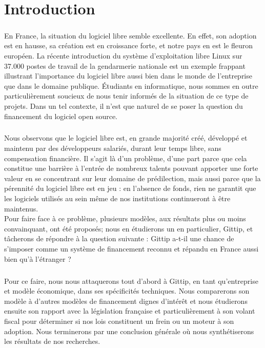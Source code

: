 \chapter*{Introduction}

\paragraph{}
En France, la situation du logiciel libre semble excellente.
En effet, son adoption est en hausse, sa création est en croissance forte,
et notre pays en est le fleuron européen.
La récente introduction du système d'exploitation libre Linux sur 37.000
postes de travail de la gendarmerie nationale est un exemple frappant
illustrant l'importance du logiciel libre aussi bien dans le monde de
l'entreprise que dans le domaine publique.
Étudiants en informatique, nous sommes en outre particulièrement soucieux
de nous tenir informés de la situation de ce type de projets.
Dans un tel contexte, il n'est que naturel de se poser la question du
financement du logiciel open source.

\paragraph{}
Nous observons que le logiciel libre est, en grande majorité créé,
développé et maintenu par des développeurs salariés, durant leur temps
libre, sans compensation financière. Il s'agit là d'un problème, d'une
part parce que cela constitue une barrière à l'entrée de nombreux talents
pouvant apporter une forte valeur en se concentrant sur leur domaine de
prédilection, mais aussi parce que la pérennité du logiciel libre est en
jeu : en l'absence de fonds, rien ne garantit que les logiciels utilisés
au sein même de nos institutions continueront à être maintenus.\\
Pour faire face à ce problème, plusieurs modèles, aux résultats plus ou
moins convainquant, ont été proposés; nous en étudierons un en
particulier, Gittip, et tâcherons de répondre à la question suivante :
Gittip a-t-il une chance de s'imposer comme un système de financement
reconnu et répandu en France aussi bien qu'à l'étranger ?

\paragraph{}
Pour ce faire, nous nous attaquerons tout d'abord à Gittip, en tant
qu'entreprise et modèle économique, dans ses spécificités techniques.
Nous comparerons son modèle à d'autres modèles de financement
dignes d'intérêt et nous étudierons ensuite son rapport avec la législation
française et particulièrement à son volant fiscal pour déterminer si nos
lois constituent un frein ou un moteur à son adoption.
Nous terminerons par une conclusion générale où nous synthétiserons
les résultats de nos recherches.
